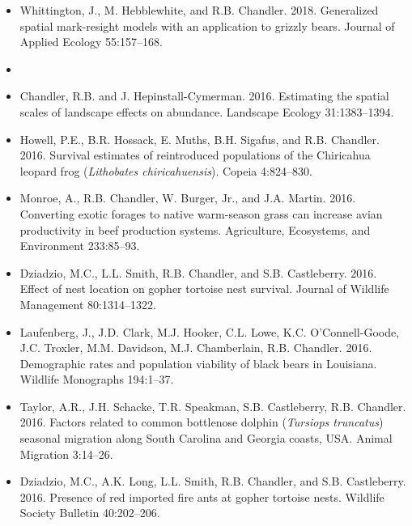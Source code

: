 \documentclass[12pt]{article}
\begin{document}
\begin{itemize}
\item Whittington, J., M. Hebblewhite, and
  R.B. Chandler. 2018. Generalized spatial mark-resight models with an 
  application to grizzly bears. Journal of Applied Ecology
  55:157--168. 



\item[] { \\}

\item Chandler, R.B. and J. Hepinstall-Cymerman. 2016. Estimating
  the spatial scales of landscape effects on abundance. Landscape
  Ecology 31:1383--1394. 

\item Howell, P.E., B.R. Hossack, E. Muths, B.H. Sigafus, and
  R.B. Chandler. 2016. Survival estimates of reintroduced populations
  of the Chiricahua leopard frog ({\it Lithobates
    chiricahuensis}). Copeia 4:824--830.   

\item Monroe, A., R.B. Chandler, W. Burger, Jr., and J.A. Martin. 2016. 
  Converting exotic forages to native warm-season grass can
  increase avian productivity in beef production systems. Agriculture,
  Ecosystems, and Environment 233:85--93. 

\item Dziadzio, M.C., L.L. Smith, R.B. Chandler, and
  S.B. Castleberry. 2016. Effect of nest location on gopher
  tortoise nest survival. Journal of Wildlife Management 80:1314--1322.

\item Laufenberg, J., J.D. Clark, M.J. Hooker, C.L. Lowe,
  K.C. O'Connell-Goode, J.C. Troxler, M.M. Davidson, M.J. Chamberlain,
  R.B. Chandler. 2016. Demographic rates and population viability
  of black bears in Louisiana. Wildlife Monographs 194:1--37.

\item Taylor, A.R., J.H. Schacke, T.R. Speakman, S.B. Castleberry,
  R.B. Chandler. 2016. Factors related to common bottlenose dolphin
  ({\it Tursiops truncatus}) seasonal migration along South Carolina
  and Georgia coasts, USA. Animal Migration 3:14--26.

\item Dziadzio, M.C., A.K. Long, L.L. Smith, R.B. Chandler, and
  S.B. Castleberry. 2016. Presence of red imported fire ants at
  gopher tortoise nests. Wildlife Society Bulletin 40:202--206.  


\end{itemize}
\end{document}
